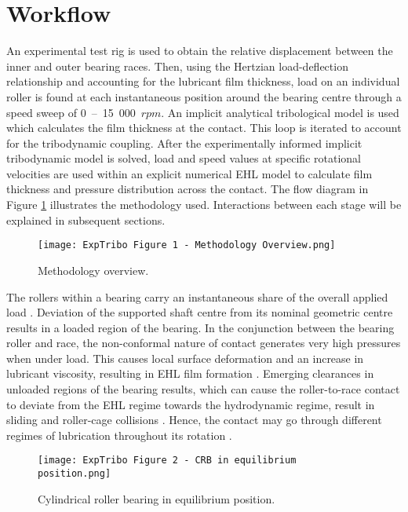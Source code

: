 \section{Workflow}

An experimental test rig is used to obtain the relative displacement between the inner and outer bearing races. Then, using the Hertzian load-deflection relationship and accounting for the lubricant film thickness, load on an individual roller is found at each instantaneous position around the bearing centre through a speed sweep of 0~–~15~000~$rpm$. An implicit analytical tribological model is used which calculates the film thickness at the contact. This loop is iterated to account for the tribodynamic coupling. After the experimentally informed implicit tribodynamic model is solved, load and speed values at specific rotational velocities are used within an explicit numerical EHL model to calculate film thickness and pressure distribution across the contact. The flow diagram in Figure \ref{Experimental Tribodynamics Methodology Overview} illustrates the methodology used. Interactions between each stage will be explained in subsequent sections.

\begin{figure}
	\centering
    \texttt{[image: ExpTribo Figure 1 - Methodology Overview.png]}
	\caption{Methodology overview.}
	\label{Experimental Tribodynamics Methodology Overview}
\end{figure}

The rollers within a bearing carry an instantaneous share of the overall applied load \cite{Guo2020}. Deviation of the supported shaft centre from its nominal geometric centre results in a loaded region of the bearing. In the conjunction between the bearing roller and race, the non-conformal nature of contact generates very high pressures when under load. This causes local surface deformation and an increase in lubricant viscosity, resulting in EHL film formation \cite{Gohar1988} \cite{Grubin1949}. Emerging clearances in unloaded regions of the bearing results, which can cause the roller-to-race contact to deviate from the EHL regime towards the hydrodynamic regime, result in sliding and roller-cage collisions \cite{Mohammadpour2015c}. Hence, the contact may go through different regimes of lubrication throughout its rotation \cite{Denni2019}.

\begin{figure}
	\centering
	\texttt{[image: ExpTribo Figure 2 - CRB in equilibrium position.png]}
	\caption{Cylindrical roller bearing in equilibrium position.}
	\label{CRB in equilibrium position}
\end{figure}


